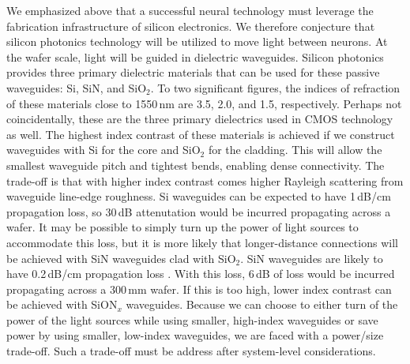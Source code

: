 \documentclass[twocolumn]{article}
\begin{document}
We emphasized above that a successful neural technology must leverage the fabrication infrastructure of silicon electronics. We therefore conjecture that silicon photonics technology will be utilized to move light between neurons. At the wafer scale, light will be guided in dielectric waveguides. Silicon photonics provides three primary dielectric materials that can be used for these passive waveguides: Si, SiN, and SiO$_2$. To two significant figures, the indices of refraction of these materials close to 1550\,nm are 3.5, 2.0, and 1.5, respectively. Perhaps not coincidentally, these are the three primary dielectrics used in CMOS technology as well. The highest index contrast of these materials is achieved if we construct waveguides with Si for the core and SiO$_2$ for the cladding. This will allow the smallest waveguide pitch and tightest bends, enabling dense connectivity. The trade-off is that with higher index contrast comes higher Rayleigh scattering from waveguide line-edge roughness. Si waveguides can be expected to have 1\,dB/cm propagation loss, so 30\,dB attenutation would be incurred propagating across a wafer. It may be possible to simply turn up the power of light sources to accommodate this loss, but it is more likely that longer-distance connections will be achieved with SiN waveguides clad with SiO$_2$. SiN waveguides are likely to have 0.2\,dB/cm propagation loss \cite{}. With this loss, 6\,dB of loss would be incurred propagating across a 300\,mm wafer. If this is too high, lower index contrast can be achieved with SiON$_x$ waveguides. Because we can choose to either turn of the power of the light sources while using smaller, high-index waveguides or save power by using smaller, low-index waveguides, we are faced with a power/size trade-off. Such a trade-off must be address after system-level considerations.
\end{document}

